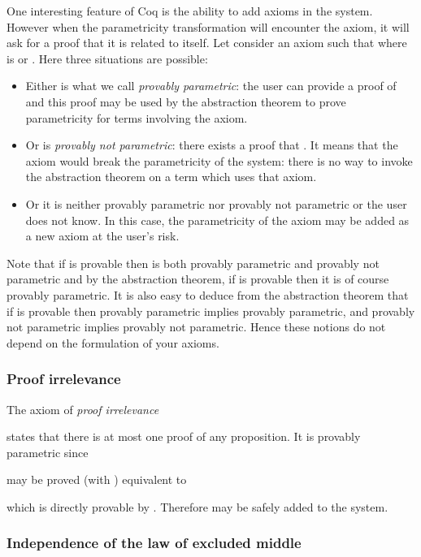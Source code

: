 \documentclass[a4paper,USenglish]{lipics}
\def\coq{\textsf{Coq}\xspace}
\begin{document}
One interesting feature of \coq is the ability to add axioms in the
system. However when the parametricity transformation  will
encounter the axiom, it will ask for a proof that it is related to
itself. Let consider an axiom  such that  where  is  or .
Here three situations are possible:
\begin{itemize}
  \item Either  is what we call \emph{provably parametric}: the user
   can provide a proof of  and this proof may be used
   by the abstraction theorem to prove parametricity for terms involving
   the axiom.
  \item Or  is \emph{provably not parametric}: there exists a proof
   that . It means that the axiom would break the
   parametricity of the system: there is no way to invoke the abstraction
   theorem on a term which uses that axiom.
  \item Or it is neither provably parametric nor provably not parametric
   or the user does not know. In this case, the parametricity of the
   axiom may be added as a new axiom at the user's risk.
\end{itemize}
Note that if  is provable then  is both provably parametric and
provably not parametric and by the abstraction theorem, if  is provable
then it is of course provably parametric. It is also easy to deduce from the
abstraction theorem that if  is provable then
  provably parametric implies  provably parametric,
    and  provably not parametric implies  provably not parametric.
Hence these notions do not depend on the formulation of your axioms.

\subsubsection{Proof irrelevance}\label{sec:examples:axioms:pi}

The axiom of \emph{proof irrelevance}

states that there is at most one proof
of any proposition. It is provably parametric since

may be proved (with ) equivalent to

which is directly provable by .
Therefore  may be safely added to the system.

\subsubsection{Independence of the law of excluded middle}\label{sec:examples:axioms:independence}
\end{document}
